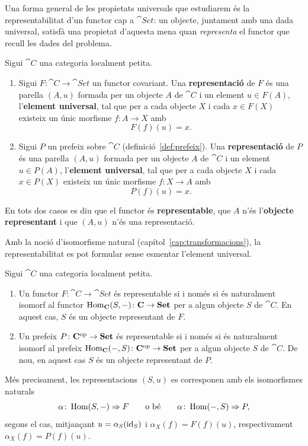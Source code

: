 Una forma general de les propietats universals que estudiarem és la representabilitat d'un functor cap a $\cat{Set}$: un objecte, juntament amb una dada universal, satisfà una propietat d'aquesta mena quan \emph{representa} el functor que recull les dades del problema.

\begin{definicio}[Representació]
\label{def:representable}
Sigui $\cat{C}$ una categoria localment petita.
\begin{enumerate}
\item Sigui $F\colon\cat{C}\to\cat{Set}$ un functor covariant. Una \textbf{representació} de $F$ és una parella $(A,u)$ formada per un objecte $A$ de $\cat{C}$ i un element $u\in F(A)$, l'\textbf{element universal}, tal que per a cada objecte $X$ i cada $x\in F(X)$ existeix un únic morfisme $f\colon A\to X$ amb
\[
F(f)(u)=x.
\]
\item Sigui $P$ un prefeix sobre $\cat{C}$ (definició~\ref{def:prefeix}). Una \textbf{representació} de $P$ és una parella $(A,u)$ formada per un objecte $A$ de $\cat{C}$ i un element $u\in P(A)$, l'\textbf{element universal}, tal que per a cada objecte $X$ i cada $x\in P(X)$ existeix un únic morfisme $f\colon X\to A$ amb
\[
P(f)(u)=x.
\]
\end{enumerate}
En tots dos casos es diu que el functor és \textbf{representable}, que $A$ n'és l'\textbf{objecte representant} i que $(A,u)$ n'és una representació.
\end{definicio}

Amb la noció d'isomorfisme natural (capítol~\ref{cap:transformacions}), la representabilitat es pot formular sense esmentar l'element universal.

\begin{proposicio}\label{prop:representable-iso}
Sigui $\cat{C}$ una categoria localment petita.
\begin{enumerate}
\item Un functor $F\colon\cat{C}\to\cat{Set}$ és representable si i només si és naturalment isomorf al functor $\operatorname{Hom}_{\mathbf{C}}(S,-)\colon\mathbf{C}\to\mathbf{Set}$ per a algun objecte $S$ de $\cat{C}$. En aquest cas, $S$ és un objecte representant de $F$.
\item Un prefeix $P\colon\mathbf{C}^{\mathrm{op}}\to\mathbf{Set}$ és representable si i només si és naturalment isomorf al prefeix $\operatorname{Hom}_{\mathbf{C}}(-,S)\colon\mathbf{C}^{\mathrm{op}}\to\mathbf{Set}$ per a algun objecte $S$ de $\cat{C}$. De nou, en aquest cas $S$ és un objecte representant de $P$.
\end{enumerate}
Més precisament, les representacions $(S,u)$ es corresponen amb els isomorfismes naturals
\[
\alpha\colon\operatorname{Hom}(S,-)\Rightarrow F
\qquad\text{o bé}\qquad
\alpha\colon\operatorname{Hom}(-,S)\Rightarrow P,
\]
segons el cas, mitjançant $u=\alpha_S(\operatorname{id}_S)$ i $\alpha_X(f)=F(f)(u)$, respectivament $\alpha_X(f)=P(f)(u)$.
\end{proposicio}

